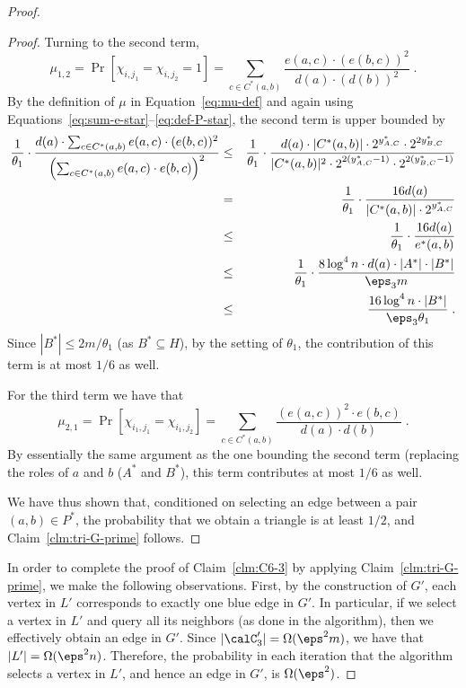 \begin{proof}
\begin{proof}
Turning to the second term, 
\begin{equation}
\mu_{1,2} = 
\Pr[\chi_{i,j_1}=\chi_{i,j_2}=1] 
  = \sum_{c\in C^*(a,b)} \frac{e(a,c)\cdot (e(b,c))^2}{d(a)\cdot (d(b))^2}\;.
\end{equation}
By the definition of $\mu$ in Equation~\eqref{eq:mu-def}
and again using Equations~\eqref{eq:sum-e-star}--\eqref{eq:def-P-star}, the second term is upper bounded by
\begin{eqnarray}
\frac{1}{\theta_1}\cdot \frac{d(a)\cdot \sum_{c\in C^*(a,b)} e(a,c)\cdot (e(b,c))^2 }
                           {\left( \sum_{c\in C^*(a,b)} e(a,c)\cdot e(b,c)\right)^2}  &\leq&
\frac{1}{\theta_1}\cdot \frac{d(a) \cdot |C^*(a,b)| \cdot 2^{y^*_{\tiny A,C}}\cdot 2^{2y^*_{\tiny B,C}}} 
                           {|C^*(a,b)|^2 \cdot 2^{2(y^*_{\tiny A,C}-1)}\cdot 2^{2(y^*_{\tiny B,C}-1)}} \\
 &=&      
 \frac{1}{\theta_1}\cdot \frac{ 16d(a) }
                           {|C^*(a,b)| \cdot 2^{y^*_{\tiny A,C}}} \\   
 &\leq&  \frac{1}{\theta_1}\cdot \frac{16 d(a) }{e^*(a,b)}       \\
 &\leq&    \frac{1}{\theta_1}\cdot \frac{8 \log^4 n \cdot d(a) \cdot |A^{*}|\cdot |B^{*}|}{\eps_3 m }   \\
 &\leq& \frac{16 \log^4 n \cdot |B^{*}|}{\eps_3 \theta_1}  \;.
\end{eqnarray}
Since $|B^*| \leq 2m/\theta_1$ (as $B^* \subseteq H$), by the setting of $\theta_1$, the contribution of this term is at most $1/6$ as well.

For the third term we have that 
\begin{equation}\label{eq:cheb-C6-case3}
\mu_{2,1} = 
  \Pr[\chi_{i_1,j_1}=\chi_{i_1,j_2}] = 
   \sum_{c\in C^*(a,b)} \frac{(e(a,c))^2\cdot e(b,c)}{d(a)\cdot d(b)}\;.
\end{equation}
By essentially the same argument as the one bounding the second term (replacing the roles of $a$ and $b$ ($A^*$ and $B^*$), this term contributes at most $1/6$ as well. 

We have thus shown that, conditioned on selecting an edge between a pair $(a,b) \in P^*$, the probability that we obtain a triangle is at least $1/2$, and Claim~\ref{clm:tri-G-prime} follows.
\end{proof}

\medskip
In order to complete the proof of
Claim~\ref{clm:C6-3} by applying Claim~\ref{clm:tri-G-prime}, we make the following observations. First, by the construction of $G'$, each vertex in $L'$  corresponds to exactly one blue edge in $G'$. In particular, if  we select a vertex in $L'$ and query all its neighbors (as done in the algorithm), then we effectively obtain an edge in $G'$. Since $|\calC_3'|= \Omega(\eps^2 m)$, we have that $|L'| = \Omega(\eps^2 n)$.
Therefore, the probability in each iteration that the algorithm selects a vertex in $L'$, and hence an edge in $G'$, is $\Omega(\eps^2)$. 


\end{proof}
